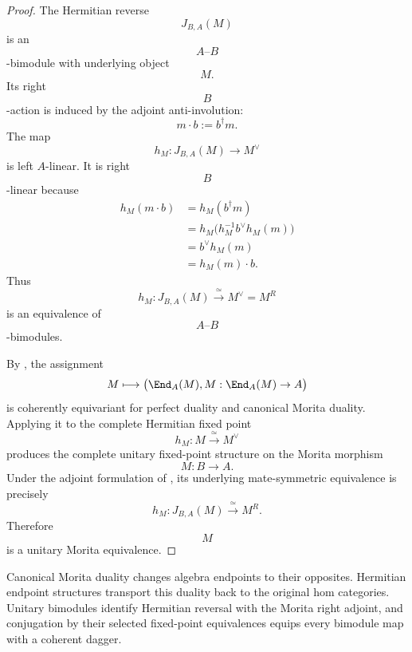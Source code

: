\begin{proof}
The Hermitian reverse
\[
    J_{B,A}(M)
\]
is an
\[
    A\text{--}B
\]
-bimodule with underlying object
\[
    M.
\]
Its right
\[
    B
\]
-action is induced by the adjoint anti-involution:
\[
    m\cdot b
    :=
    b^\dagger m.
\]
The map
\[
    h_M
    \colon
    J_{B,A}(M)
    \longrightarrow
    M^\vee
\]
is left $A$-linear. It is right
\[
    B
\]
-linear because
\[
\begin{aligned}
    h_M(m\cdot b)
    &=
    h_M(b^\dagger m)
    \\
    &=
    h_M
    \bigl(
        h_M^{-1}b^\vee h_M(m)
    \bigr)
    \\
    &=
    b^\vee h_M(m)
    \\
    &=
    h_M(m)\cdot b.
\end{aligned}
\]
Thus
\[
    h_M
    \colon
    J_{B,A}(M)
    \xrightarrow{\;\simeq\;}
    M^\vee
    =
    M^R
\]
is an equivalence of
\[
    A\text{--}B
\]
-bimodules.

By
,
the assignment
\[
    M
    \longmapsto
    \bigl(
        \End_A(M),
        M:\End_A(M)\to A
    \bigr)
\]
is coherently equivariant for perfect duality and canonical Morita
duality. Applying it to the complete Hermitian fixed point
\[
    h_M
    \colon
    M
    \xrightarrow{\;\simeq\;}
    M^\vee
\]
produces the complete unitary fixed-point structure on the Morita
morphism
\[
    M
    \colon
    B
    \longrightarrow
    A.
\]
Under the adjoint formulation of
,
its underlying mate-symmetric equivalence is precisely
\[
    h_M
    \colon
    J_{B,A}(M)
    \xrightarrow{\;\simeq\;}
    M^R.
\]
Therefore
\[
    M
\]
is a unitary Morita equivalence.
\end{proof}

Canonical Morita duality changes algebra endpoints to their opposites.
Hermitian endpoint structures transport this duality back to the
original hom categories. Unitary bimodules identify Hermitian reversal
with the Morita right adjoint, and conjugation by their selected
fixed-point equivalences equips every bimodule map with a coherent
dagger.